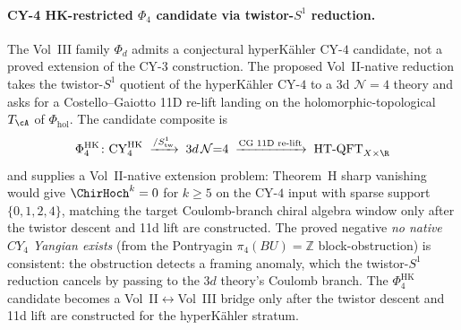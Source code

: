 \paragraph{CY-4 HK-restricted $\Phi_4$ candidate via twistor-$S^1$ reduction.}
The Vol~III family \(\Phi_d\) admits a conjectural hyperK\"ahler
CY-$4$ candidate, not a proved extension of the CY-$3$ construction.
The proposed Vol~II-native reduction takes the twistor-$S^1$ quotient
of the hyperK\"ahler CY-$4$ to a 3d $\mathcal N = 4$ theory and asks
for a Costello--Gaiotto 11D re-lift landing on the
holomorphic-topological $T_\cA$ of $\Phi_{\mathrm{hol}}$. The candidate
composite is
\[
 \Phi_4^{\mathrm{HK}}\colon
 \mathrm{CY}_4^{\mathrm{HK}}
 \;\xrightarrow{/S^1_{\mathrm{tw}}}\;
 3d\,\mathcal N{=}4
 \;\xrightarrow{\text{CG 11D re-lift}}\;
 \mathrm{HT\text{-}QFT}_{X\times\R}
\]
and supplies a Vol~II-native extension problem: Theorem~H sharp
vanishing would give $\ChirHoch^k = 0$ for $k \ge 5$ on the CY-$4$
input with sparse support \(\{0,1,2,4\}\), matching the target
Coulomb-branch chiral algebra window only after the twistor descent and
11d lift are constructed. The proved negative
\emph{no native $CY_4$ Yangian exists} (from the Pontryagin
$\pi_4(BU) = \mathbb Z$ block-obstruction) is consistent: the
obstruction detects a framing anomaly, which the twistor-$S^1$
reduction cancels by passing to the $3d$ theory's Coulomb
branch. The $\Phi_4^{\mathrm{HK}}$ candidate becomes a
Vol~II$\leftrightarrow$Vol~III bridge only after the twistor descent
and 11d lift are constructed for the hyperK\"ahler stratum.

